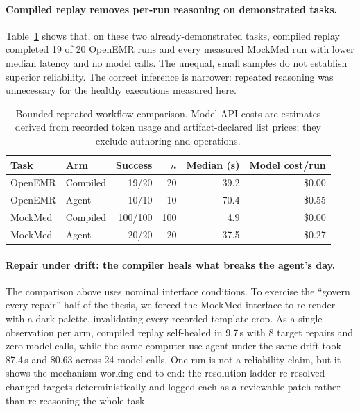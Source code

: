 \paragraph{Compiled replay removes per-run reasoning on demonstrated tasks.}
Table~\ref{tab:comparison} shows that, on these two already-demonstrated tasks,
compiled replay completed 19 of 20 OpenEMR runs and every measured MockMed run
with lower median latency and no model calls. The unequal, small samples do not
establish superior reliability. The correct inference is narrower: repeated
reasoning was unnecessary for the healthy executions measured here.

\begin{table}[t]
\centering
\caption{Bounded repeated-workflow comparison. Model API costs are estimates
derived from recorded token usage and artifact-declared list prices; they
exclude authoring and operations.}
\label{tab:comparison}
\begin{tabular}{llrrrr}
\toprule
Task & Arm & Success & $n$ & Median (s) & Model cost/run \\
\midrule
OpenEMR & Compiled & 19/20 & 20 & 39.2 & \$0.00 \\
OpenEMR & Agent & 10/10 & 10 & 70.4 & \$0.55 \\
MockMed & Compiled & 100/100 & 100 & 4.9 & \$0.00 \\
MockMed & Agent & 20/20 & 20 & 37.5 & \$0.27 \\
\bottomrule
\end{tabular}
\end{table}

\paragraph{Repair under drift: the compiler heals what breaks the agent's day.}
The comparison above uses nominal interface conditions. To exercise the
``govern every repair'' half of the thesis, we forced the MockMed interface to
re-render with a dark palette, invalidating every recorded template crop. As a
single observation per arm, compiled replay self-healed in 9.7\,s with 8 target repairs and zero
model calls, while the same computer-use agent under the same drift took 87.4\,s
and \$0.63 across 24 model calls. One run is not a reliability claim, but it
shows the mechanism working end to end: the resolution ladder re-resolved changed
targets deterministically and logged each as a reviewable patch rather than
re-reasoning the whole task.

